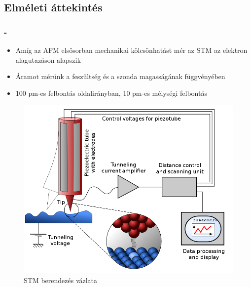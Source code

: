 \documentclass[aspectratio=169]{beamer}
\newcommand{\framet}{\frametitle{\secname{} - \subsecname}}
\begin{document}
\subsection{Elméleti áttekintés}
\begin{frame}
\framet
\begin{minipage}[m]{.55\linewidth}
\begin{itemize}
\item Amíg az AFM elsősorban mechanikai kölcsönhatást mér az STM az elektron alagutazáson alapszik
\item Áramot mérünk a feszültség és a szonda magasságának függvényében
\item 100 pm-es felbontás oldalirányban, 10 pm-es mélységi felbontás 
\end{itemize}
\end{minipage}
\hfill
\begin{minipage}{.44\linewidth}
\begin{figure}
\includegraphics[width=\linewidth]{stm.png}
\caption{STM berendezés vázlata}
\end{figure}
\end{minipage}
\end{frame}
\end{document}
